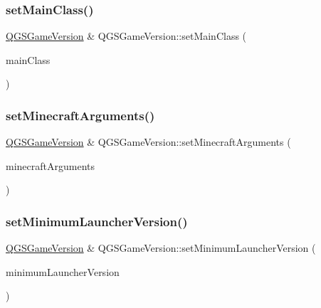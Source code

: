 \mbox{\label{class_q_g_s_game_version_a005ff0cefb59b7e1bb0bf88c566d08e4}} 
\subsubsection{\texorpdfstring{set\+Main\+Class()}{setMainClass()}}
{\footnotesize\ttfamily \mbox{\hyperlink{class_q_g_s_game_version}{Q\+G\+S\+Game\+Version}} \& Q\+G\+S\+Game\+Version\+::set\+Main\+Class (\begin{DoxyParamCaption}\item[{const Q\+String \&}]{main\+Class }\end{DoxyParamCaption})}

\mbox{\label{class_q_g_s_game_version_ae49a35203539517914af3329b0ac0c5b}} 
\subsubsection{\texorpdfstring{set\+Minecraft\+Arguments()}{setMinecraftArguments()}}
{\footnotesize\ttfamily \mbox{\hyperlink{class_q_g_s_game_version}{Q\+G\+S\+Game\+Version}} \& Q\+G\+S\+Game\+Version\+::set\+Minecraft\+Arguments (\begin{DoxyParamCaption}\item[{const Q\+String \&}]{minecraft\+Arguments }\end{DoxyParamCaption})}

\mbox{\label{class_q_g_s_game_version_a42527c9cfcdb7d1e612d47f5d8f42907}} 
\subsubsection{\texorpdfstring{set\+Minimum\+Launcher\+Version()}{setMinimumLauncherVersion()}}
{\footnotesize\ttfamily \mbox{\hyperlink{class_q_g_s_game_version}{Q\+G\+S\+Game\+Version}} \& Q\+G\+S\+Game\+Version\+::set\+Minimum\+Launcher\+Version (\begin{DoxyParamCaption}\item[{const int}]{minimum\+Launcher\+Version }\end{DoxyParamCaption})}

